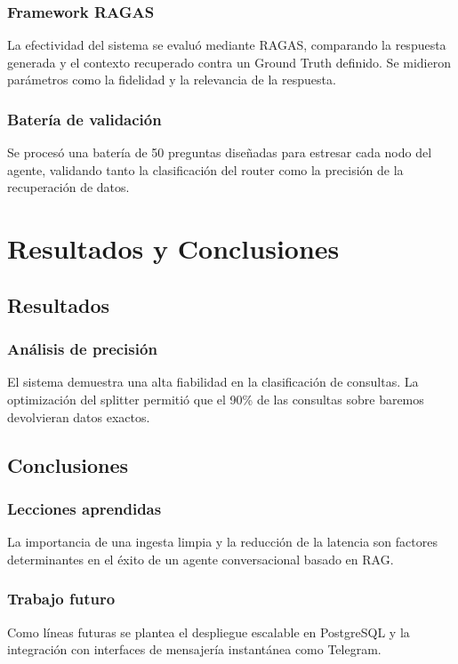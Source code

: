 \documentclass[12pt,a4paper,oneside]{report}
\begin{document}
\section{Framework RAGAS}
La efectividad del sistema se evaluó mediante RAGAS, comparando la respuesta generada y el contexto recuperado contra un Ground Truth definido. Se midieron parámetros como la fidelidad y la relevancia de la respuesta.

\section{Batería de validación}
Se procesó una batería de 50 preguntas diseñadas para estresar cada nodo del agente, validando tanto la clasificación del router como la precisión de la recuperación de datos.

\part{Resultados y Conclusiones}

\chapter{Resultados}
\section{Análisis de precisión}
El sistema demuestra una alta fiabilidad en la clasificación de consultas. La optimización del splitter permitió que el 90\% de las consultas sobre baremos devolvieran datos exactos.

\chapter{Conclusiones}
\section{Lecciones aprendidas}
La importancia de una ingesta limpia y la reducción de la latencia son factores determinantes en el éxito de un agente conversacional basado en RAG.

\section{Trabajo futuro}
Como líneas futuras se plantea el despliegue escalable en PostgreSQL y la integración con interfaces de mensajería instantánea como Telegram.
\end{document}
